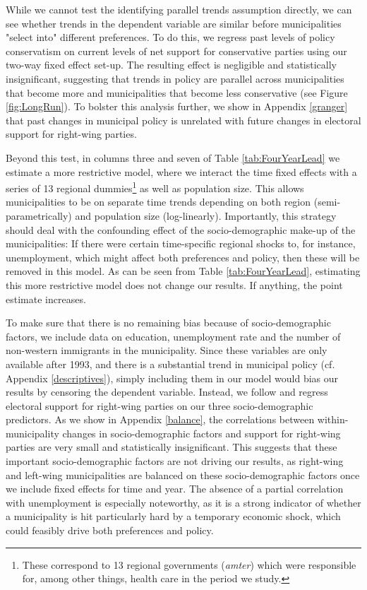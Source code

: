 \documentclass[a4paper,12pt]{article}
\begin{document}
While we cannot test the identifying parallel trends assumption directly, we can see whether trends in the dependent variable are similar before municipalities "select into" different preferences.  To do this, we regress past levels of policy conservatism on current levels of net support for conservative parties using our two-way fixed effect set-up. The resulting effect is negligible and statistically insignificant, suggesting that trends in policy are parallel across municipalities that become more and municipalities that become less conservative  (see Figure \ref{fig:LongRun}). To  bolster this analysis further,  we show in Appendix \ref{granger} that past changes in municipal policy is unrelated with future changes in electoral support for right-wing parties.


Beyond this test, in columns three and seven of Table \ref{tab:FourYearLead} we estimate a more restrictive model, where we interact the time fixed effects with a series of 13 regional dummies\footnote{These correspond to  13 regional governments (\textit{amter}) which were responsible for, among other things, health care in the period we study.} as well as population size. This allows municipalities to be on separate time trends depending on both region (semi-parametrically) and population size (log-linearly). Importantly, this strategy should deal with the confounding effect of the socio-demographic make-up of the municipalities: If there were certain time-specific regional shocks to, for instance, unemployment, which might affect both preferences and policy, then these will be removed in this model. As can be seen from Table \ref{tab:FourYearLead}, estimating this more restrictive model does not change our results. If anything, the point estimate increases.

To make sure that there is no remaining bias because of socio-demographic factors, we include data on education, unemployment rate and the number of non-western immigrants in the municipality. Since these variables are only available after 1993, and there is a substantial trend in municipal policy (cf. Appendix \ref{descriptives}), simply including them in our model would bias our results by censoring the dependent variable. Instead, we follow \citep{pei2018poorly} and regress electoral support for right-wing parties on our three socio-demographic predictors. As we show in Appendix \ref{balance}, the correlations between within-municipality changes in socio-demographic factors and support for right-wing parties are very small and statistically insignificant. This suggests that these important socio-demographic factors are not driving our results, as right-wing and left-wing municipalities are balanced on these socio-demographic factors once we include fixed effects for time and year. The absence of a partial correlation with unemployment is especially noteworthy, as it is a strong indicator of whether a municipality is hit particularly hard by a temporary economic shock, which could feasibly drive both preferences and policy.
\end{document}
